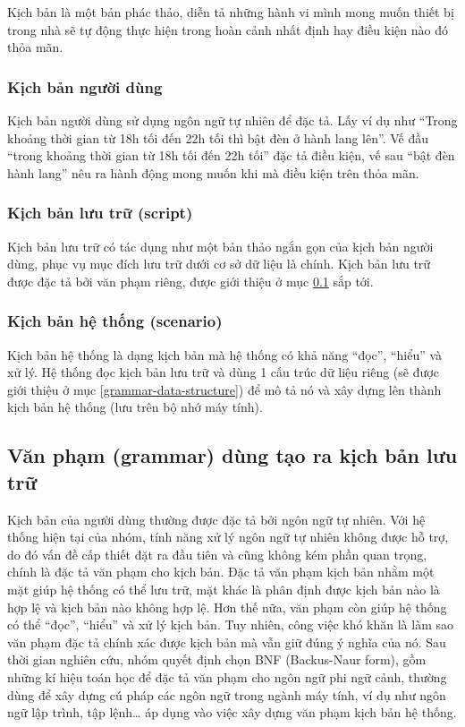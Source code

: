 \documentclass[12pt,a4paper,oneside]{extbook}
\begin{document}
Kịch bản là một bản phác thảo, diễn tả những hành vi mình mong muốn thiết bị trong nhà sẽ tự động thực hiện trong hoàn cảnh nhất định hay điều kiện nào đó thỏa mãn. 

\subsubsection{Kịch bản người dùng}

Kịch bản người dùng sử dụng ngôn ngữ tự nhiên để đặc tả. Lấy ví dụ như “Trong khoảng thời gian từ 18h tối đến 22h tối thì bật đèn ở hành lang lên”. Vế đầu “trong khoảng thời gian từ 18h tối đến 22h tối” đặc tả điều kiện, vế sau “bật đèn hành lang” nêu ra hành động mong muốn khi mà điều kiện trên thỏa mãn.

\subsubsection{Kịch bản lưu trữ (script)}

Kịch bản lưu trữ có tác dụng như một bản thảo ngắn gọn của kịch bản người dùng, phục vụ mục đích lưu trữ dưới cơ sở dữ liệu là chính. Kịch bản lưu trữ được đặc tả bởi văn phạm riêng, được giới thiệu ở mục \ref{grammar} sắp tới.

\subsubsection{Kịch bản hệ thống (scenario)} 

Kịch bản hệ thống là dạng kịch bản mà hệ thống có khả năng “đọc”, “hiểu” và xử lý. Hệ thống đọc kịch bản lưu trữ và dùng 1 cấu trúc dữ liệu riêng (sẽ được giới thiệu ở mục \ref{grammar-data-structure}) để mô tả nó và xây dựng lên thành kịch bản hệ thống (lưu trên bộ nhớ máy tính).

\subsection{Văn phạm (grammar) dùng tạo ra kịch bản lưu trữ}\label{grammar}

Kịch bản của người dùng thường được đặc tả bởi ngôn ngữ tự nhiên. Với hệ thống hiện tại của nhóm, tính năng xử lý ngôn ngữ tự nhiên không được hỗ trợ, do đó vấn đề cấp thiết đặt ra đầu tiên và cũng không kém phần quan trọng, chính là đặc tả văn phạm cho kịch bản. Đặc tả văn phạm kịch bản nhằm một mặt giúp hệ thống có thể lưu trữ, mặt khác là phân định được kịch bản nào là hợp lệ và kịch bản nào không hợp lệ. Hơn thế nữa, văn phạm còn giúp hệ thống có thể “đọc”, “hiểu” và xử lý kịch bản. Tuy nhiên, công việc khó khăn là làm sao văn phạm đặc tả chính xác được kịch bản mà vẫn giữ đúng ý nghĩa của nó. Sau thời gian nghiên cứu, nhóm quyết định chọn BNF (Backus-Naur form), gồm những kí hiệu toán học để đặc tả văn phạm cho ngôn ngữ phi ngữ cảnh, thường dùng để xây dựng cú pháp các ngôn ngữ trong ngành máy tính, ví dụ như ngôn ngữ lập trình, tập lệnh\dots\hspace{0mm} áp dụng vào việc xây dựng văn phạm kịch bản hệ thống.\\
\end{document}
